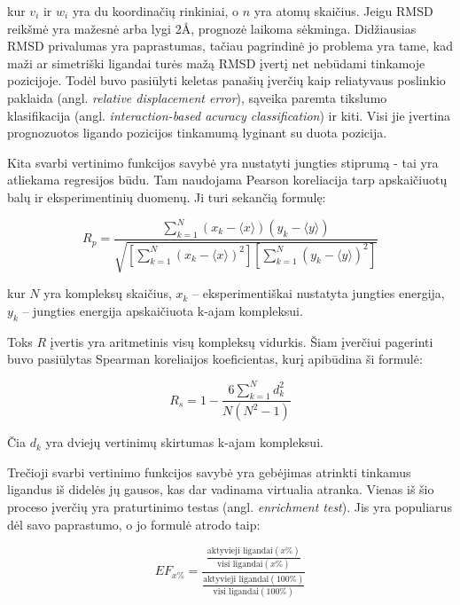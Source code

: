 kur $v_i$ ir $w_i$ yra du koordinačių rinkiniai, o $n$ yra atomų skaičius. Jeigu RMSD reikšmė yra mažesnė arba lygi 2\AA , prognozė laikoma sėkminga.\cite{berry_practical_2015} Didžiausias RMSD privalumas yra paprastumas, tačiau pagrindinė jo problema yra tame, kad maži ar simetriški ligandai turės mažą RMSD įvertį net nebūdami tinkamoje pozicijoje. Todėl buvo pasiūlyti keletas panašių įverčių kaip reliatyvaus poslinkio paklaida (angl. \textit{relative displacement error}), sąveika paremta tikslumo klasifikacija (angl. \textit{interaction-based acuracy classification}) ir kiti.\cite{huang_scoring_2010} Visi jie įvertina prognozuotos ligando pozicijos tinkamumą lyginant su duota pozicija.

Kita svarbi vertinimo funkcijos savybė yra nustatyti jungties stiprumą - tai yra atliekama regresijos būdu. Tam naudojama Pearson koreliacija tarp apskaičiuotų balų ir eksperimentinių duomenų.\cite{ain_machine-learning_2015} Ji turi sekančią formulę:

\begin{equation}
R_p = \frac{\sum_{k=1}^{N} (x_k - \langle x \rangle)(y_k - \langle y \rangle)}{\sqrt{[\sum_{k=1}^{N} (x_k - \langle x \rangle)^2][\sum_{k=1}^{N} (y_k - \langle y \rangle)^2]}}
\end{equation}  

kur $N$ yra kompleksų skaičius, $x_k$ -- eksperimentiškai nustatyta jungties energija, $y_k$ -- jungties energija apskaičiuota k-ajam kompleksui.\cite{huang_scoring_2010}

Toks $R$ įvertis yra aritmetinis visų kompleksų vidurkis. Šiam įverčiui pagerinti buvo pasiūlytas Spearman koreliaijos koeficientas, kurį apibūdina ši formulė:

\begin{equation}
R_s = 1 - \frac{6 \sum_{k=1}^{N} d_k^2}{N(N^2 - 1)}
\end{equation} 

Čia $d_k$ yra dviejų vertinimų skirtumas k-ajam kompleksui.

Trečioji svarbi vertinimo funkcijos savybė yra gebėjimas atrinkti tinkamus ligandus iš didelės jų gausos, kas dar vadinama virtualia atranka. Vienas iš šio proceso įverčių yra praturtinimo testas (angl. \textit{enrichment test}). Jis yra populiarus dėl savo paprastumo,\cite{ain_machine-learning_2015}\cite{wojcikowski_performance_2017} o jo formulė atrodo taip:

\begin{equation}
EF_{x\%} = \frac{\frac{\text{aktyvieji ligandai}(x\%)}{\text{visi ligandai}(x\%)}}{\frac{\text{aktyvieji ligandai}(100\%)}{\text{visi ligandai}(100\%)}}
\end{equation}


